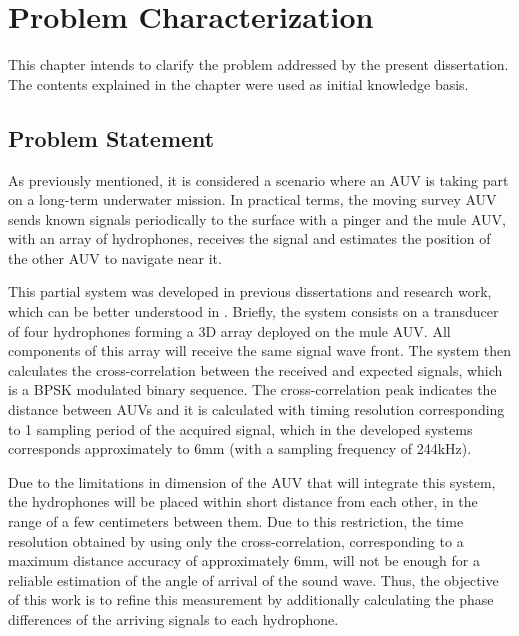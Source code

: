 \chapter{Problem Characterization} \label{chap:prob_statement}

This chapter intends to clarify the problem addressed by the present dissertation. The contents explained in the  chapter were used as initial knowledge basis.

\section{Problem Statement}

As previously mentioned, it is considered a scenario where an AUV is taking part on a long-term underwater mission. In practical terms, the moving survey AUV sends known signals periodically to the surface with a pinger and the mule AUV, with an array of hydrophones, receives the signal and estimates the position of the other AUV to navigate near it.


This partial system was developed in previous dissertations and research work, which can be better understood in \cite{afonso-thesis}. Briefly, the system consists on a transducer of four hydrophones forming a 3D array deployed on the mule AUV. All components of this array will receive the same signal wave front. The system then calculates the cross-correlation between the received and expected signals, which is a BPSK modulated binary sequence. The cross-correlation peak indicates the distance between AUVs and it is calculated with timing resolution corresponding to 1 sampling period of the acquired signal, which in the developed systems corresponds approximately to 6mm (with a sampling frequency of 244kHz).


Due to the limitations in dimension of the AUV that will integrate this system, the hydrophones will be placed within short distance from each other, in the range of a few centimeters between them. Due to this restriction, the time resolution obtained by using only the cross-correlation, corresponding to a maximum distance accuracy of approximately 6mm, will not be enough for a reliable estimation of the angle of arrival of the sound wave. Thus, the objective of this work is to refine this measurement by additionally calculating the phase differences of the arriving signals to each hydrophone. 
